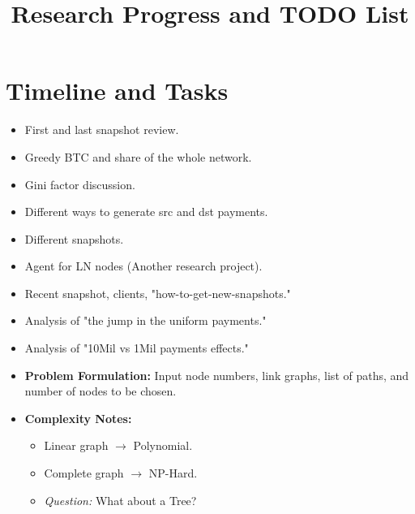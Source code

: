 \documentclass[11pt]{article}
\title{Research Progress and TODO List}
\begin{document}
\maketitle

\section*{Timeline and Tasks}

\begin{description}[style=nextline, font=\bfseries\color{blue}]
    \item[Jan 19] 
    \begin{itemize}
        \item First and last snapshot review. \checkmark
        \item Greedy BTC and share of the whole network. \checkmark
    \end{itemize}

    \item[Feb 5] 
    \begin{itemize}
        \item Gini factor discussion.
        \item Different ways to generate src and dst payments. \checkmark
        \item Different snapshots. \checkmark
        \item Agent for LN nodes (Another research project).
    \end{itemize}

    \item[Feb 19] 
    \begin{itemize}
        \item Recent snapshot, clients, "how-to-get-new-snapshots."
        \item Analysis of "the jump in the uniform payments."
        \item Analysis of "10Mil vs 1Mil payments effects."
        \item \textbf{Problem Formulation:} Input node numbers, link graphs, list of paths, and number of nodes to be chosen.
        \item \textbf{Complexity Notes:} 
        \begin{itemize}
            \item Linear graph $\rightarrow$ Polynomial.
            \item Complete graph $\rightarrow$ NP-Hard.
            \item \textit{Question:} What about a Tree?
        \end{itemize}
    \end{itemize}
\end{description}
\end{document}
